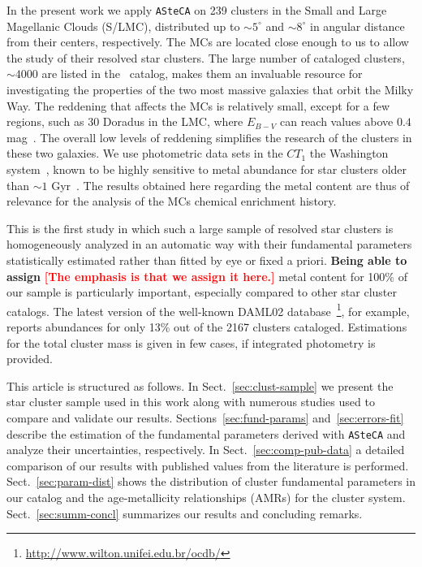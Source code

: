 \documentclass[draft]{aa}
\newcommand{\LEt}[1]{\textcolor{red}{\textbf{[#1]}}}
\begin{document}
In the present work we apply \texttt{ASteCA} on 239 clusters in the Small and
Large Magellanic Clouds (S/LMC), distributed up to ${\sim}5^{\circ}$ and $
{\sim}8^{\circ}$ in angular distance from their centers, respectively.
%
The MCs are located close enough to us to allow the study of their resolved star
clusters. The large number of cataloged clusters, $\sim4000$ are listed in
the~\cite{Bica_2008} catalog, makes them an invaluable resource for
investigating the properties of the two most massive galaxies that orbit the
Milky Way.
%
The reddening that affects the MCs is relatively small, except for a few regions,
such as 30 Doradus in the LMC, where $E_{B-V}$ can reach values above $0.4$
mag~\citep{Piatti_2015b}. The overall low levels of reddening simplifies
the research of the clusters in these two galaxies.
%
We use photometric data sets in the $CT_1$ the Washington
system~\citep{Canterna_1976,Geisler_1996}, known to be highly sensitive
to metal abundance for star clusters older than ${\sim}1$
Gyr~\citep{Geisler_1999}.
The results obtained here regarding the metal content are thus of relevance for
the analysis of the MCs chemical enrichment history.

This is the first study in which such a large sample of resolved star clusters is
homogeneously analyzed in an automatic way with their fundamental
parameters statistically estimated rather than fitted by eye or fixed a priori.
%
\textbf{Being able to assign} \LEt{The emphasis is that we assign it here.}
metal content for 100\% of our sample is
particularly important, especially compared to other star cluster catalogs. The
latest version of the well-known DAML02 database~\citep[v3.5, 2016 Jan 28;][]
{Dias_2002}\footnote{\url{http://www.wilton.unifei.edu.br/ocdb/}},
for example, reports abundances for only 13\% out of the 2167
clusters cataloged. Estimations for the total cluster mass is given in few
cases, if integrated photometry is provided.

This article is structured as follows.
In Sect.~\ref{sec:clust-sample} we present the star cluster sample used in
this work along with numerous studies used to compare and validate our
results.
Sections~\ref{sec:fund-params} and~\ref{sec:errors-fit} describe the estimation
of the fundamental parameters derived with \texttt{ASteCA} and analyze their
uncertainties, respectively.
In Sect.~\ref{sec:comp-pub-data} a detailed comparison of our results with
published values from the literature is performed.
Sect.~\ref{sec:param-dist} shows the distribution of cluster fundamental
parameters in our catalog and the age-metallicity relationships (AMRs) for the
cluster system.
Sect.~\ref{sec:summ-concl} summarizes our results and concluding remarks.
\end{document}
